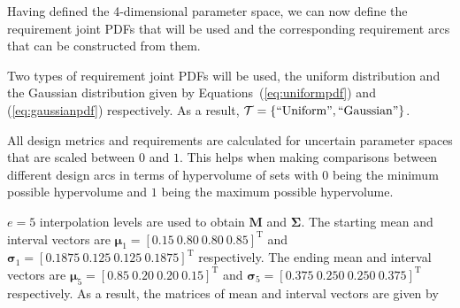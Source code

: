 Having defined the 4-dimensional parameter space, we can now define the requirement joint \acp{PDF} that will be used and the corresponding requirement arcs that can be constructed from them. 

Two types of requirement joint \acp{PDF} will be used, the uniform distribution and the Gaussian distribution given by Equations~(\ref{eq:uniformpdf}) and (\ref{eq:gaussianpdf}) respectively. As a result, $\mathcal{T} = \left\{\mathrm{``Uniform"},\mathrm{``Gaussian"}\right\}$.

All design metrics and requirements are calculated for uncertain parameter spaces that are scaled between $0$ and $1$. This helps when making comparisons between different design arcs in terms of hypervolume of sets with $0$ being the minimum possible hypervolume and $1$ being the maximum possible hypervolume.

$e=5$ interpolation levels are used to obtain $\mathbf{M}$ and $\boldsymbol{\Sigma}$. The starting mean and interval vectors are $\boldsymbol{\mu}_1 = \left[0.15 ~ 0.80 ~ 0.80 ~ 0.85\right]^{\mathrm{T}}$ and $\boldsymbol{\sigma}_1 = \left[0.1875 ~ 0.125 ~ 0.125 ~ 0.1875\right]^{\mathrm{T}}$ respectively. The ending mean and interval vectors are $\boldsymbol{\mu}_5 = \left[0.85 ~ 0.20 ~ 0.20 ~ 0.15\right]^{\mathrm{T}}$ and $\boldsymbol{\sigma}_5 = \left[0.375 ~ 0.250 ~ 0.250 ~ 0.375\right]^{\mathrm{T}}$ respectively. As a result, the matrices of mean and interval vectors are given by



